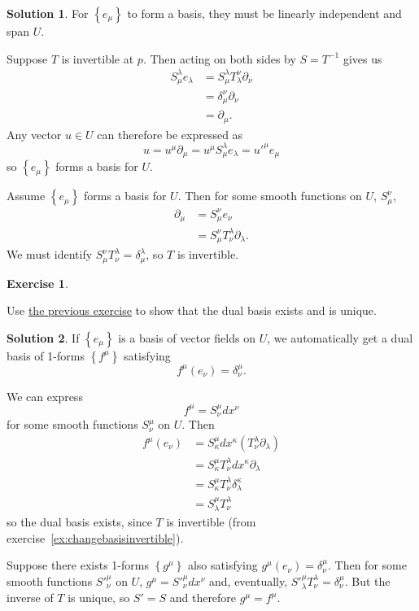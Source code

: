 \documentclass[11pt, a4paper]{article}
\theoremstyle{definition}
\newtheorem{ex}{Exercise}[part]
\newtheorem{sol}{Solution}[part]
\begin{document}
\begin{sol}

For $\left\{e_\mu\right\}$ to form a basis, they must be linearly independent and span $U$.

Suppose $T$ is invertible at $p$. Then acting on both sides by $S = T^{-1}$ gives us
\begin{align*}
    S_\mu^\lambda e_\lambda &= S_\mu^\lambda T_\lambda^\nu \partial_\nu \\
        &= \delta_\mu^\nu \partial_\nu \\
        &= \partial_\mu.
\end{align*}
Any vector $u \in U$ can therefore be expressed as
\[
    u = u^\mu \partial_\mu = u^\mu S_\mu^\lambda e_\lambda = u'^\mu e_\mu
\]
so $\left\{e_\mu\right\}$ forms a basis for $U$.

Assume $\left\{e_\mu\right\}$ forms a basis for $U$. Then for some smooth functions on $U$, $S_\mu^\nu$,
\begin{align*}
    \partial_\mu &= S_\mu^\nu e_\nu \\
                 &= S_\mu^\nu T_\nu^\lambda \partial_\lambda.
\end{align*}
We must identify $S_\mu^\nu T_\nu^\lambda = \delta_\mu^\lambda$, so $T$ is invertible.

\end{sol}

\begin{ex}\label{ex:dualbasisexists}

Use \hyperref[ex:changebasisinvertible]{the previous exercise} to show that the dual basis exists and is unique.

\end{ex}

\begin{sol}

If $\left\{e_\mu\right\}$ is a basis of vector fields on $U$, we automatically get a dual basis of 1-forms $\left\{f^\mu\right\}$ satisfying
\[
    f^\mu(e_\nu) = \delta_\nu^\mu.
\]

We can express
\[
    f^\mu = S_\nu^\mu dx^\nu
\]
for some smooth functions $S_\nu^\mu$ on $U$. Then
\begin{align*}
    f^\mu(e_\nu) &= S_\kappa^\mu dx^\kappa (T_\nu^\lambda \partial_\lambda) \\
                 &= S_\kappa^\mu T_\nu^\lambda dx^\kappa \partial_\lambda \\
                 &= S_\kappa^\mu T_\nu^\lambda \delta_\lambda^\kappa \\
                 &= S_\lambda^\mu T_\nu^\lambda
\end{align*}
so the dual basis exists, since $T$ is invertible (from exercise~\ref{ex:changebasisinvertible}).

Suppose there exists 1-forms $\left\{g^\mu\right\}$ also satisfying $g^\mu(e_\nu) = \delta^\mu_\nu$.
Then for some smooth functions $S'^\mu_\nu$ on $U$, $g^\mu = S'^\mu_\nu dx^\nu$ and, eventually, $S'^\mu_\lambda T^\lambda_\nu = \delta ^\mu_\nu$. But the inverse of $T$ is unique, so $S' = S$ and therefore $g^\mu = f^\mu$.

\end{sol}
\end{document}
